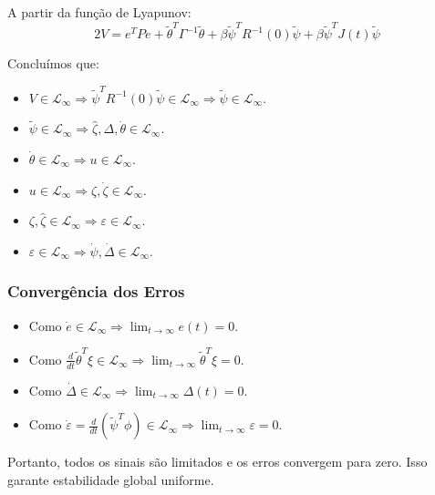 \documentclass[10pt]{article}
\begin{document}
A partir da função de Lyapunov:
\begin{equation}
    2V = e^T P e + \tilde{\theta}^T \Gamma^{-1} \tilde{\theta} + \beta \tilde{\psi}^T R^{-1}(0) \tilde{\psi} + \beta \tilde{\psi}^T J(t) \tilde{\psi}
\end{equation}

Concluímos que:
\begin{itemize}
    \item \( V \in \mathcal{L}_\infty \Rightarrow \tilde{\psi}^T R^{-1}(0) \tilde{\psi} \in \mathcal{L}_\infty \Rightarrow \tilde{\psi} \in \mathcal{L}_\infty \).
    \item \( \tilde{\psi} \in \mathcal{L}_\infty \Rightarrow \hat{\zeta}, \Delta, \dot{\theta} \in \mathcal{L}_\infty \).
    \item \( \dot{\theta} \in \mathcal{L}_\infty \Rightarrow u \in \mathcal{L}_\infty \).
    \item \( u \in \mathcal{L}_\infty \Rightarrow \zeta, \dot{\zeta} \in \mathcal{L}_\infty \).
    \item \( \zeta, \hat{\zeta} \in \mathcal{L}_\infty \Rightarrow \varepsilon \in \mathcal{L}_\infty \).
    \item \( \varepsilon \in \mathcal{L}_\infty \Rightarrow \dot{\psi}, \dot{\Delta} \in \mathcal{L}_\infty \).
\end{itemize}

\subsubsection{Convergência dos Erros}

\begin{itemize}
    \item Como \( \dot{e} \in \mathcal{L}_\infty \Rightarrow \lim_{t \to \infty} e(t) = 0 \).
    \item Como \( \frac{d}{dt} \tilde{\theta}^T \xi \in \mathcal{L}_\infty \Rightarrow \lim_{t \to \infty} \tilde{\theta}^T \xi = 0 \).
    \item Como \( \dot{\Delta} \in \mathcal{L}_\infty \Rightarrow \lim_{t \to \infty} \Delta(t) = 0 \).
    \item Como \( \dot{\varepsilon} = \frac{d}{dt} (\tilde{\psi}^T \phi) \in \mathcal{L}_\infty \Rightarrow \lim_{t \to \infty} \varepsilon = 0 \).
\end{itemize}

Portanto, todos os sinais são limitados e os erros convergem para zero. Isso garante estabilidade global uniforme.
\end{document}
